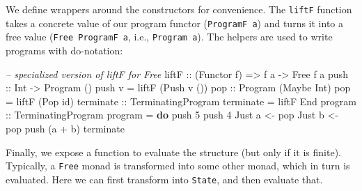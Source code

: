 \documentclass[runningheads,plain]{llncs}
\newenvironment{Shaded}{}{}
\newcommand{\KeywordTok}[1]{\textcolor[rgb]{0.00,0.44,0.13}{\textbf{#1}}}
\newcommand{\DataTypeTok}[1]{\textcolor[rgb]{0.56,0.13,0.00}{#1}}
\newcommand{\DecValTok}[1]{\textcolor[rgb]{0.25,0.63,0.44}{#1}}
\newcommand{\CommentTok}[1]{\textcolor[rgb]{0.38,0.63,0.69}{\textit{#1}}}
\newcommand{\OtherTok}[1]{\textcolor[rgb]{0.00,0.44,0.13}{#1}}
\newcommand{\FunctionTok}[1]{\textcolor[rgb]{0.02,0.16,0.49}{#1}}
\newcommand{\NormalTok}[1]{#1}
\begin{document}
We define wrappers around the constructors for convenience. The \texttt{liftF} function takes a concrete value of our program functor (\texttt{ProgramF a}) and turns it into a 
free value (\texttt{Free ProgramF a}, i.e., \texttt{Program a}).
The helpers are used to write programs with do-notation:
\begin{Shaded}
\begin{Highlighting}[]
\CommentTok{-- specialized version of liftF for Free}
\OtherTok{liftF ::} \NormalTok{(}\DataTypeTok{Functor}\NormalTok{ f) => f a -> }\DataTypeTok{Free}\NormalTok{ f a}
\OtherTok{push ::} \DataTypeTok{Int} \OtherTok{->} \DataTypeTok{Program}\NormalTok{ ()}
\NormalTok{push v }\FunctionTok{=}\NormalTok{ liftF (}\DataTypeTok{Push}\NormalTok{ v ())   }
\OtherTok{pop ::} \DataTypeTok{Program}\NormalTok{ (}\DataTypeTok{Maybe} \DataTypeTok{Int}\NormalTok{) }
\NormalTok{pop }\FunctionTok{=}\NormalTok{ liftF (}\DataTypeTok{Pop}\NormalTok{ id)}
\OtherTok{terminate ::} \DataTypeTok{TerminatingProgram}  
\NormalTok{terminate }\FunctionTok{=}\NormalTok{ liftF }\DataTypeTok{End}
\OtherTok{program ::} \DataTypeTok{TerminatingProgram}  
\NormalTok{program }\FunctionTok{=} \KeywordTok{do}    
\NormalTok{    push }\DecValTok{5}  
\NormalTok{    push }\DecValTok{4}  
    \DataTypeTok{Just}\NormalTok{ a }\OtherTok{<-}\NormalTok{ pop    }
    \DataTypeTok{Just}\NormalTok{ b }\OtherTok{<-}\NormalTok{ pop    }
\NormalTok{    push (a }\FunctionTok{+}\NormalTok{ b)    }
\NormalTok{    terminate}
\end{Highlighting}
\end{Shaded}

Finally, we expose a function to evaluate the structure (but
only if it is finite). Typically, a \texttt{Free} monad is transformed
into some other monad, which in turn is evaluated. Here we can first transform into \texttt{State}, and then evaluate that.
\end{document}
